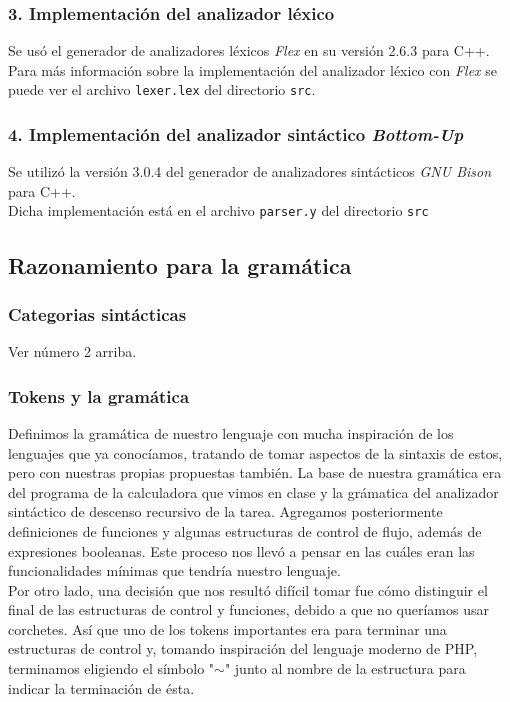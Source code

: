 \documentclass[12pt]{article}
\begin{document}
\subsubsection*{3. Implementación del analizador léxico}
Se usó el generador de analizadores léxicos \textit{Flex} en su versión 2.6.3 para C++. \\
Para más información sobre la implementación del analizador léxico con \textit{Flex} se puede ver el archivo \texttt{lexer.lex} del directorio \texttt{src}.\\
\subsubsection*{4. Implementación del analizador sintáctico \textit{Bottom-Up}}
Se utilizó la versión 3.0.4 del generador de analizadores sintácticos \textit{GNU Bison} para C++. \\
Dicha implementación está en el archivo \texttt{parser.y} del directorio \texttt{src}


\subsection*{Razonamiento para la gramática}
\subsubsection*{Categorias sintácticas}
Ver número 2 arriba.
\subsubsection*{Tokens y la gramática}
Definimos la gramática de nuestro lenguaje con mucha inspiración de los lenguajes que ya conocíamos, tratando de tomar aspectos de la sintaxis de estos, pero con nuestras propias propuestas también. La base de nuestra gramática era del programa de la calculadora que vimos en clase y la grámatica del analizador sintáctico de descenso recursivo de la tarea. Agregamos posteriormente definiciones de funciones y algunas estructuras de control de flujo, además de expresiones booleanas. Este proceso nos llevó a pensar en las cuáles eran las funcionalidades mínimas que tendría nuestro lenguaje. \\

Por otro lado, una decisión que nos resultó difícil tomar fue cómo distinguir el final de las estructuras de control y funciones, debido a que no queríamos usar corchetes. Así que uno de los tokens importantes era para terminar una estructuras de control y, tomando inspiración del lenguaje moderno de PHP, terminamos eligiendo el símbolo "$\sim$" junto al nombre de la estructura para indicar la terminación de ésta. \\
\end{document}
